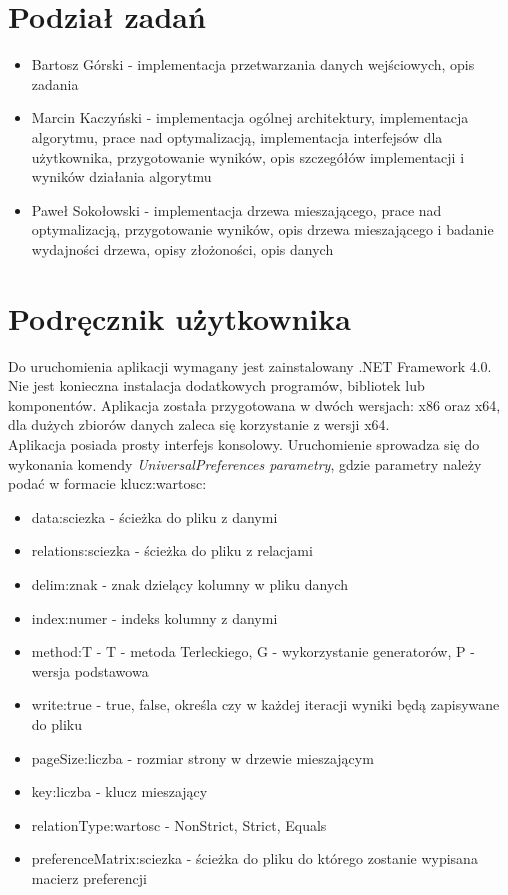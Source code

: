 \documentclass[a4paper,12pt]{article}
\begin{document}
\section{Podział zadań}

\begin{itemize}
\item Bartosz Górski - implementacja przetwarzania danych wejściowych, opis zadania
\item Marcin Kaczyński - implementacja ogólnej architektury, implementacja algorytmu, prace nad optymalizacją, implementacja interfejsów dla użytkownika, przygotowanie wyników, opis szczegółów implementacji i wyników działania algorytmu
\item Paweł Sokołowski - implementacja drzewa mieszającego, prace nad optymalizacją, przygotowanie wyników, opis drzewa mieszającego i badanie wydajności drzewa, opisy złożoności, opis danych
\end{itemize}

\appendix
\section{Podręcznik użytkownika}

Do uruchomienia aplikacji wymagany jest zainstalowany .NET Framework 4.0. Nie jest konieczna instalacja dodatkowych programów, bibliotek lub komponentów. Aplikacja została przygotowana w dwóch wersjach: x86 oraz x64, dla dużych zbiorów danych zaleca się korzystanie z wersji x64.\\

Aplikacja posiada prosty interfejs konsolowy. Uruchomienie sprowadza się do wykonania komendy \textit{UniversalPreferences parametry}, gdzie parametry należy podać w formacie klucz:wartosc:

\begin{itemize}
\item data:sciezka - ścieżka do pliku z danymi
\item relations:sciezka - ścieżka do pliku z relacjami
\item delim:znak - znak dzielący kolumny w pliku danych
\item index:numer - indeks kolumny z danymi
\item method:T - {T - metoda Terleckiego, G - wykorzystanie generatorów, P - wersja podstawowa}
\item write:true - {true, false}, określa czy w każdej iteracji wyniki będą
zapisywane do pliku
\item pageSize:liczba - rozmiar strony w drzewie mieszającym
\item key:liczba - klucz mieszający
\item relationType:wartosc - {NonStrict, Strict, Equals}
\item preferenceMatrix:sciezka - ścieżka do pliku do którego zostanie wypisana macierz preferencji
\end{itemize}
\end{document}

